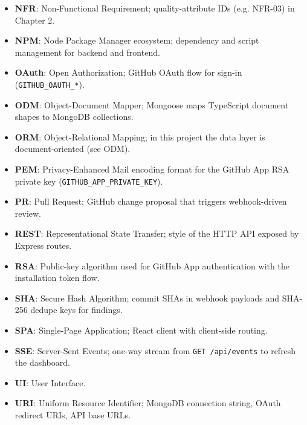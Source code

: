 \begin{itemize}
\item \textbf{NFR}: Non-Functional Requirement; quality-attribute IDs (e.g. NFR-03) in Chapter 2.
\item \textbf{NPM}: Node Package Manager ecosystem; dependency and script management for backend and frontend.
\item \textbf{OAuth}: Open Authorization; GitHub OAuth flow for sign-in (\texttt{GITHUB\_OAUTH\_*}).
\item \textbf{ODM}: Object-Document Mapper; Mongoose maps TypeScript document shapes to MongoDB collections.
\item \textbf{ORM}: Object-Relational Mapping; in this project the data layer is document-oriented (see ODM).
\item \textbf{PEM}: Privacy-Enhanced Mail encoding format for the GitHub App RSA private key (\texttt{GITHUB\_APP\_PRIVATE\_KEY}).
\item \textbf{PR}: Pull Request; GitHub change proposal that triggers webhook-driven review.
\item \textbf{REST}: Representational State Transfer; style of the HTTP API exposed by Express routes.
\item \textbf{RSA}: Public-key algorithm used for GitHub App authentication with the installation token flow.
\item \textbf{SHA}: Secure Hash Algorithm; commit SHAs in webhook payloads and SHA-256 dedupe keys for findings.
\item \textbf{SPA}: Single-Page Application; React client with client-side routing.
\item \textbf{SSE}: Server-Sent Events; one-way stream from \texttt{GET /api/events} to refresh the dashboard.
\item \textbf{UI}: User Interface.
\item \textbf{URI}: Uniform Resource Identifier; MongoDB connection string, OAuth redirect URIs, API base URLs.
\end{itemize}

